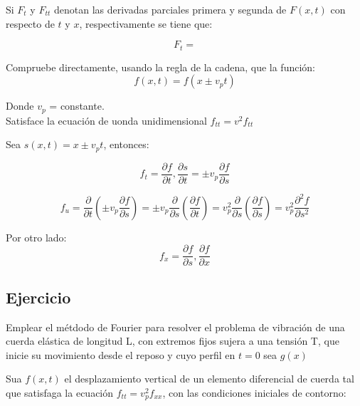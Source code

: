 \documentclass[]{article}
\begin{document}
Si $F_t$ y $F_{tt}$ denotan las derivadas parciales primera y segunda de $F(x,t)$ con respecto de $t$ y $x$, respectivamente se tiene que:

\begin{equation}
F_t=
\end{equation}


Compruebe directamente, usando la regla de la cadena, que la función:\\

\begin{equation}
f(x,t)=f(x\pm v_pt)
\end{equation}

Donde $v_p$ = constante.\\

Satisface la ecuación de uonda unidimensional $f_{tt}=v^2f_{tt}$

Sea $s(x,t)=x \pm v_p t$, entonces:

\begin{equation}
f_t=\frac{ \partial f}{\partial t},\frac{\partial s}{\partial t}= \pm v_p \frac{\partial f}{\partial s}
\end{equation}

\begin{equation}  
f_u=\frac{\partial}{\partial t} (\pm v_p \frac{\partial f}{\partial s})= \pm v_p \frac{\partial }{\partial s}(\frac{\partial f}{\partial t})=v_p^2 \frac{\partial }{\partial s} (\frac{\partial f}{\partial s})=v_p^2 \frac{\partial^2 f}{\partial s^2}
\end{equation}

Por otro lado:\\

\begin{equation}
f_x=\frac{\partial f}{\partial s},\frac{\partial f}{\partial x}
\end{equation}


\subsection{Ejercicio}

Emplear el métdodo de Fourier para resolver el problema de vibración de una cuerda elástica de longitud L, con extremos fijos sujera a una tensión T, que inicie su movimiento desde el reposo y cuyo perfil en $t=0$ sea $g(x)$

Sua $f(x,t)$ el desplazamiento vertical de un elemento diferencial de cuerda tal que satisfaga la ecuación $f_{tt}=v_p^2 f_{xx}$, con las condiciones iniciales de contorno:\\
\end{document}
